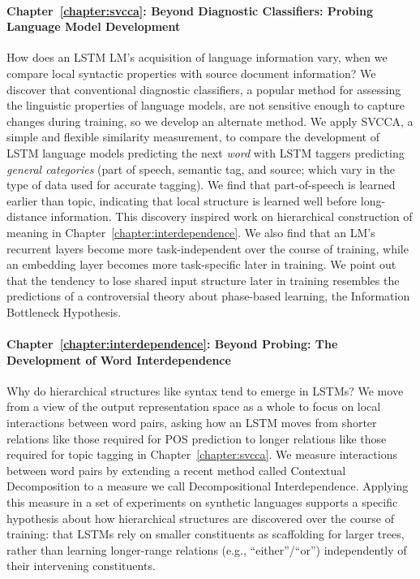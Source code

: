 \paragraph*{Chapter~\ref{chapter:svcca}: Beyond Diagnostic Classifiers: Probing Language Model Development} How does an LSTM LM's acquisition of language information vary, when we compare local syntactic properties with source document information? We discover that conventional diagnostic classifiers, a popular method for assessing the linguistic properties of language models, are not sensitive enough to capture changes during training, so we develop an alternate method. We apply SVCCA, a simple and flexible similarity measurement, to compare the development of LSTM language models predicting the next \textit{word} with LSTM taggers predicting \textit{general categories} (part of speech, semantic tag, and source; which vary in the type of data used for accurate tagging). We find that part-of-speech is learned earlier than topic, indicating that local structure is learned well before long-distance information. This discovery inspired work on hierarchical construction of meaning in Chapter~\ref{chapter:interdependence}. We also find that an LM's recurrent layers become more task-independent over the course of training, while an embedding layer becomes more task-specific later in training. We point out that the tendency to lose shared input structure later in training resembles the predictions of a controversial theory about phase-based learning, the Information Bottleneck Hypothesis.

\paragraph*{Chapter~\ref{chapter:interdependence}: Beyond Probing: The Development of Word Interdependence} Why do hierarchical structures like syntax tend to emerge in LSTMs? We move from a view of the output representation space as a whole to focus on local interactions between word pairs, asking how an LSTM moves from shorter relations like those required for POS prediction to longer relations like those required for topic tagging in Chapter~\ref{chapter:svcca}. We measure interactions between word pairs by extending a recent method called Contextual Decomposition to a measure we call Decompositional Interdependence. Applying this measure in a set of experiments on synthetic languages supports a specific hypothesis about how hierarchical structures are discovered over the course of training: that LSTMs rely on smaller constituents as scaffolding for larger trees, rather than learning longer-range relations (e.g., ``either''/``or'') independently of their intervening constituents. 

